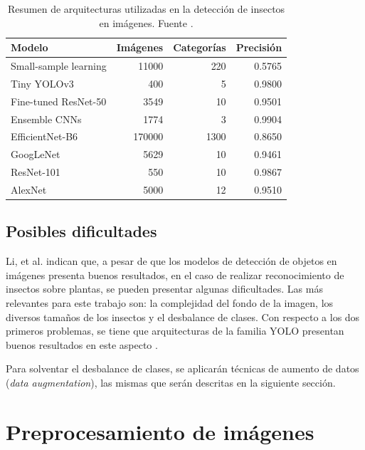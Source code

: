 \begin{table}[H]

\centering\small
\begin{tabular}{@{}lrrr@{}}
\toprule
    \textbf{Modelo} & \textbf{Imágenes} & \textbf{Categorías} & \textbf{Precisión}
\\ \midrule
    Small-sample learning \cite{yang-2021}& 11000 & 220 & 0.5765\\
    Tiny YOLOv3 \cite{rustia-2021} & 400 & 5 & 0.9800\\
    Fine-tuned ResNet-50 \cite{malathi-2021}& 3549 & 10 & 0.9501\\
    Ensemble CNNs \cite{khanramaki-2021}& 1774 & 3 & 0.9904\\
    EfficientNet-B6 \cite{sagar-2020} & 170000 & 1300 & 0.8650\\
    GoogLeNet \cite{li-2020} & 5629 & 10 & 0.9461\\
    ResNet-101 \cite{cheng-2017}& 550 & 10 & 0.9867\\
    AlexNet \cite{liu-2016}& 5000 & 12 & 0.9510\\
\bottomrule
\end{tabular}
\caption[Arquitecturas utilizadas en la detección de insectos en imágenes.]{Resumen de arquitecturas utilizadas en la detección de insectos en imágenes. Fuente \cite{li-2021}.}
\label{table:arquitecturas}
\end{table}

\subsection{Posibles dificultades}

Li, et al. \cite{li-2021} indican que, a pesar de que los modelos de detección de objetos en imágenes presenta buenos resultados, en el caso de realizar reconocimiento de insectos sobre plantas, se pueden presentar algunas dificultades. Las más relevantes para este trabajo son: la complejidad del fondo de la imagen, los diversos tamaños de los insectos y el desbalance de clases. Con respecto a los dos primeros problemas, se tiene que arquitecturas de la familia YOLO presentan buenos resultados en este aspecto \cite{he-2020}.

Para solventar el desbalance de clases, se aplicarán técnicas de aumento de datos (\textit{data augmentation}), las mismas que serán descritas en la siguiente sección.

\section{Preprocesamiento de imágenes}

